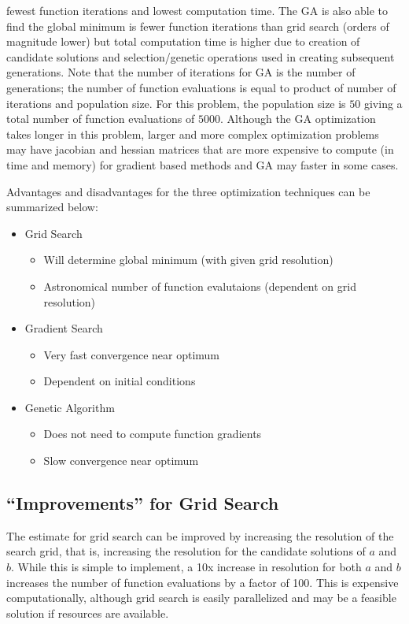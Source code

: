 \documentclass[11pt,a4paper]{article}
\begin{document}
fewest function iterations and lowest computation time. The GA is also able to
find the global minimum is fewer function iterations than grid search (orders
of magnitude lower) but total computation time is higher due to creation of
candidate solutions and selection/genetic operations used in creating
subsequent generations. Note that the number of iterations for GA is the number
of generations; the number of function evaluations is equal to product of
number of iterations and population size. For this problem, the population size
is $50$ giving a total number of function evaluations of $5000$. Although the
GA optimization takes longer in this
problem, larger and more complex optimization problems may have jacobian and
hessian matrices that are more expensive to compute (in time and memory) for
gradient based methods and GA may faster in some cases.

Advantages and disadvantages for the three optimization techniques can be
summarized below:
\begin{itemize}
    \item Grid Search
        \begin{itemize}
            \item Will determine global minimum (with given grid resolution)
            \item Astronomical number of function evalutaions (dependent on
                grid resolution)
        \end{itemize}
    \item Gradient Search
        \begin{itemize}
            \item Very fast convergence near optimum
            \item Dependent on initial conditions
        \end{itemize}
    \item Genetic Algorithm
        \begin{itemize}
            \item Does not need to compute function gradients
            \item Slow convergence near optimum
        \end{itemize}
\end{itemize}

\subsection{``Improvements'' for Grid Search}
The estimate for grid search can be improved by increasing the resolution of
the search grid, that is, increasing the resolution for the candidate solutions
of $a$ and $b$. While this is simple to implement, a 10x increase in resolution
for both $a$ and $b$ increases the number of function evaluations by a factor
of 100. This is expensive computationally, although grid search is easily
parallelized and may be a feasible solution if resources are available.
\end{document}
